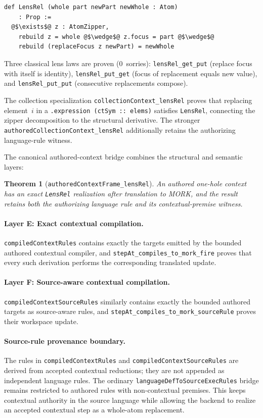 \documentclass[11pt]{article}
\newtheorem{theorem}{Theorem}[section]
\theoremstyle{definition}
\theoremstyle{remark}
\newcommand{\MORK}{\textup{MORK}}
\begin{document}
\begin{lstlisting}
def LensRel (whole part newPart newWhole : Atom)
    : Prop :=
  @$\exists$@ z : AtomZipper,
    rebuild z = whole @$\wedge$@ z.focus = part @$\wedge$@
    rebuild (replaceFocus z newPart) = newWhole
\end{lstlisting}

\noindent
Three classical lens laws are proven (0~sorries):
\texttt{lensRel\_get\_put} (replace focus with itself is identity),
\texttt{lensRel\_put\_get} (focus of replacement equals new value),
and \texttt{lensRel\_put\_put} (consecutive replacements compose).

The collection specialization \texttt{collectionContext\_lensRel} proves
that replacing element~$i$ in a \texttt{.expression (ctSym :: elems)}
satisfies \texttt{LensRel}, connecting the zipper decomposition to
the structural derivative.  The stronger
\texttt{authoredCollectionContext\_lensRel} additionally retains the
authorizing language-rule witness.

The canonical authored-context bridge combines the structural and semantic
layers:

\begin{theorem}[\texttt{authoredContextFrame\_lensRel}]
\label{thm:congelemzipper}
An authored one-hole context has an exact \texttt{LensRel} realization after
translation to \MORK{}, and the result retains both the authorizing language
rule and its contextual-premise witness.
\end{theorem}

\paragraph{Layer E: Exact contextual compilation.}
\texttt{compiledContextRules} contains exactly the targets emitted by the
bounded authored contextual compiler, and
\texttt{stepAt\_compiles\_to\_mork\_fire} proves that every such derivation
performs the corresponding translated update.

\paragraph{Layer F: Source-aware contextual compilation.}
\texttt{compiledContextSourceRules} similarly contains exactly the bounded
authored targets as source-aware rules, and
\texttt{stepAt\_compiles\_to\_mork\_sourceRule} proves their workspace update.

\paragraph{Source-rule provenance boundary.}
The rules in \texttt{compiledContextRules} and
\texttt{compiledContextSourceRules} are derived from accepted contextual
reductions; they are not appended as independent language rules.  The ordinary
\texttt{languageDefToSourceExecRules} bridge remains restricted to authored
rules with non-contextual premises.  This keeps contextual authority in the
source language while allowing the backend to realize an accepted contextual
step as a whole-atom replacement.
\end{document}
